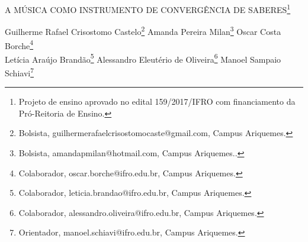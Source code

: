 \documentclass[article,12pt,onesidea,4paper,english,brazil]{abntex2}
\begin{document}
	
	
	\frenchspacing 
	
	\begin{center}
		\LARGE A MÚSICA COMO INSTRUMENTO DE CONVERGÊNCIA DE SABERES\footnote{Projeto de ensino aprovado no edital 159/2017/IFRO com financiamento da Pró-Reitoria de Ensino.}
		
		\normalsize
	Guilherme Rafael Crisostomo Castelo\footnote{Bolsista, guilhermerafaelcrisostomocaste@gmail.com, Campus Ariquemes.} 
		Amanda Pereira Milan\footnote{Bolsista, amandapmilan@hotmail.com, Campus Ariquemes..} 
	Oscar Costa Borche\footnote{Colaborador, oscar.borche@ifro.edu.br, Campus Ariquemes.} \\
	Letícia Araújo Brandão\footnote{Colaborador, leticia.brandao@ifro.edu.br, Campus Ariquemes.} 
 Alessandro Eleutério de Oliveira\footnote{Colaborador, alessandro.oliveira@ifro.edu.br, Campus Ariquemes.} 
Manoel Sampaio Schiavi\footnote{Orientador, manoel.schiavi@ifro.edu.br, Campus Ariquemes.} 
	\end{center}
	
\end{document}
